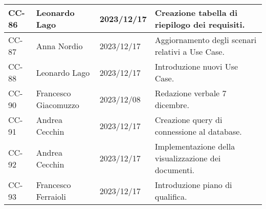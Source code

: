 {\begin{xltabular}{\textwidth}{| l | l | l | X |}
        \hline
        CC-86 & Leonardo Lago & 2023/12/17 & Creazione tabella di riepilogo dei requisiti. \\
        \hline
        CC-87 & Anna Nordio & 2023/12/17 & Aggiornamento degli scenari relativi a Use Case. \\
        \hline
        CC-88 & Leonardo Lago & 2023/12/17 & Introduzione nuovi Use Case. \\
        \hline
        CC-90 & Francesco Giacomuzzo & 2023/12/08 & Redazione verbale 7 dicembre. \\
        \hline
        CC-91 & Andrea Cecchin & 2023/12/17 & Creazione query di connessione al database. \\
        \hline
        CC-92 & Andrea Cecchin & 2023/12/17 & Implementazione della visualizzazione dei documenti. \\
        \hline 
        CC-93 & Francesco Ferraioli & 2023/12/17 & Introduzione piano di qualifica. \\
        \hline
    \end{xltabular}
}


